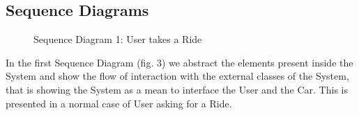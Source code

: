 \documentclass[a4paper]{article}
\begin{document}
\subsection{Sequence Diagrams}
\begin{figure}[h]
\centering
\vspace*{\fill}
\noindent{}%
\caption {Sequence Diagram 1: User takes a Ride}
\vspace*{0.5cm}
\end{figure}
In the first Sequence Diagram (fig. 3) we abstract the elements present inside the System and show the flow of interaction with the external classes of the System, that is showing the System as a mean to interface the User and the Car. This is presented in a normal case of User asking for a Ride.
\newpage
\end{document}
